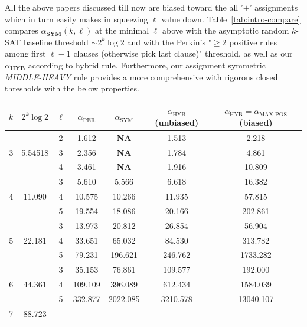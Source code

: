 \documentclass[11pt,reqno]{amsart}
\numberwithin{equation}{section}
\renewcommand{\ln}{\log}
\begin{document}
	All the above papers discussed till now are biased toward the all '$+$' assignments which in turn easily makes in squeezing $\ell$ value down.
	Table~\ref{tab:intro-compare} compares $\alpha_{\mathrm{\textbf{SYM}}}(k,\ell)$ at the minimal $\ell$ above with the asymptotic random $k$-SAT baseline threshold $\sim 2^k\ln 2$ and with the Perkin's \cite{Perkins} "$\geq 2$ positive rules among first $\ell-1$ clauses (otherwise pick last clause)" threshold, as well as our $\alpha_{\textbf{HYB}}$ according to hybrid rule.
	Furthermore, our assignment symmetric \emph{MIDDLE-HEAVY} rule provides a more comprehensive with rigorous closed thresholds with the below properties.
	\begin{table}[h!]
		\centering
		\renewcommand{\arraystretch}{1.3} 
		\begin{tabular}{|c|c|c|c|c|c|c|}
			\hline
			\textbf{$k$} & \textbf{$2^{k}\log 2$} & \textbf{$\ell$} & \textbf{$\alpha_{\text{PER}}$} & 
			\textbf{$\alpha_{\text{SYM}}$} & \textbf{$\alpha_{\text{HYB}}$(unbiased)}& 
			\textbf{$\alpha_{\text{HYB}}=\alpha_{\text{MAX-POS}}$(biased)}\\
			\hline
			\multirow{3}{*}{3} & \multirow{3}{*}{5.54518} 
			& 2 & 1.612 & \textbf{NA} & 1.513 & 2.218 \\ \cline{3-7}
			& & 3 & 2.356 & \textbf{NA} & 1.784 & 4.861 \\ \cline{3-7}
			& & 4 & 3.461 & \textbf{NA} & 1.916 & 10.809 \\ 
			\hline
			\multirow{3}{*}{4} & \multirow{3}{*}{11.090} 
			& 3 & 5.610 & 5.566 & 6.618 & 16.382 \\ \cline{3-7}
			& & 4 & 10.575 & 10.266 & 11.935 & 57.815 \\ \cline{3-7}
			& & 5 & 19.554 & 18.086 & 20.166 & 202.861 \\ 
			\hline
			\multirow{3}{*}{5} & \multirow{3}{*}{22.181} 
			& 3 & 13.973 & 20.812 & 26.854 & 56.904 \\ \cline{3-7}
			& & 4 & 33.651 & 65.032 & 84.530 & 313.782 \\ \cline{3-7}
			& & 5 & 79.231 & 196.621 & 246.762 & 1733.282 \\
			\hline
			\multirow{3}{*}{6} & \multirow{3}{*}{44.361} 
			& 3 & 35.153 & 76.861 & 109.577 & 192.000 \\ \cline{3-7}
			& & 4 & 109.109 & 396.089 & 612.434 & 1584.039 \\ \cline{3-7}
			& & 5 & 332.877 & 2022.085 & 3210.578 & 13040.107 \\
			\hline
			\multirow{3}{*}{7} & \multirow{3}{*}{88.723} 

\end{tabular}
\end{table}
\end{document}
